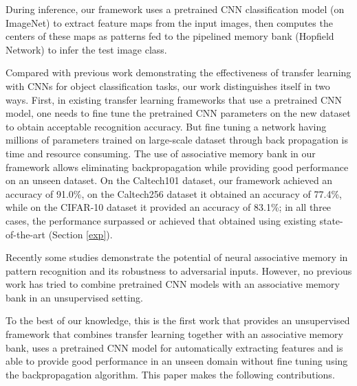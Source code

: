 \documentclass[conference]{IEEEtran}
\begin{document}
During inference, our  framework uses  a pretrained CNN classification model  (on ImageNet) to extract feature maps from the input images, then computes the centers of these maps as  patterns fed to  the pipelined memory bank (Hopfield Network) to infer the test image class.

 


Compared with previous work  \cite{karpathy2014large,tzeng2015simultaneous} demonstrating the effectiveness of transfer learning with  CNNs  for object classification tasks, our work distinguishes itself  in two ways. First, in existing transfer learning frameworks that use a pretrained CNN model,  one needs to fine tune the pretrained CNN  parameters on the new dataset to obtain acceptable recognition  accuracy. But fine tuning a network having  millions of parameters trained on large-scale dataset through back propagation is  time and resource consuming. The use of associative memory bank in our framework allows  eliminating  backpropagation while providing  good performance on an unseen dataset. On the Caltech101 dataset, our framework achieved an accuracy of 91.0\%,  on the Caltech256 dataset it obtained  an accuracy of 77.4\%,   while on the CIFAR-10 dataset it provided an accuracy of 83.1\%; in all three cases, the performance  surpassed or achieved that obtained using existing state-of-the-art (Section \ref{exp}). 



Recently some studies \cite{krotov2016dense,krotov2017dense} demonstrate the potential of neural associative memory in pattern recognition and  its robustness to adversarial inputs. However, no previous work has tried to combine pretrained CNN models with an associative memory bank in an unsupervised setting. 



To the best of our knowledge, this is the first work that  provides an unsupervised  framework  that combines transfer learning  together with an associative memory bank,  uses a pretrained CNN model for automatically extracting features and is able to provide good performance in an unseen domain without fine tuning using the backpropagation algorithm. This paper makes the following contributions.  
\end{document}

